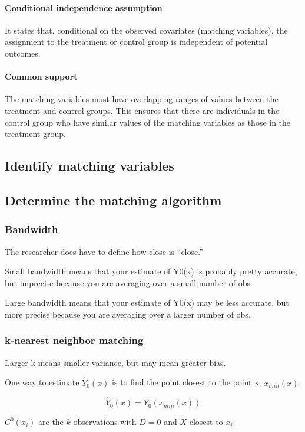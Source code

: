 \documentclass[a3paper, 8pt]{extarticle}
\begin{document}
\begin{multicols*}{5}
\paragraph{Conditional independence assumption} It states that, conditional on the observed covariates (matching variables), the assignment to the treatment or control group is independent of potential outcomes.

\paragraph{Common support} The matching variables must have overlapping ranges of values between the treatment and control groups. This ensures that there are individuals in the control group who have similar values of the matching variables as those in the treatment group.

\subsection{Identify matching variables}


\subsection{Determine the matching algorithm}

\subsubsection{Bandwidth}The researcher does have to define how close is “close.”

Small bandwidth means that your estimate of Y0(x) is probably pretty accurate, but imprecise because you are averaging over a small number of obs.

Large bandwidth means that your estimate of Y0(x) may be less accurate, but more precise because you are averaging over a larger number of obs.

\subsubsection{k-nearest neighbor matching}
Larger k means smaller variance, but may mean greater bias.

One way to estimate $\hat{Y}_0(x)$ is to find the point closest to the point x, $x_{min}(x)$.

$$\hat{Y}_0(x)=Y_0(x_{min}(x))$$

$C^0 (x_i)$ are the $k$ observations with $D=0$ and $X$ closest to $x_i$


\end{multicols*}
\end{document}
